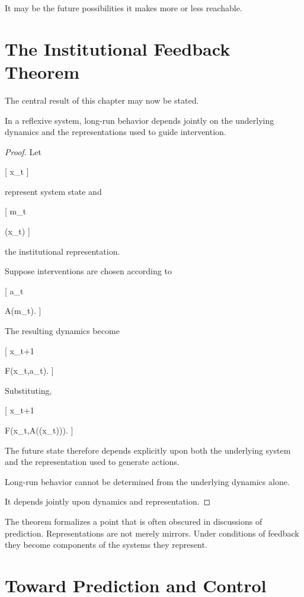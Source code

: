 \documentclass[11pt,oneside,openany]{book}
\begin{document}
It may be the future possibilities it makes more or less reachable.

\section{The Institutional Feedback Theorem}

The central result of this chapter may now be stated.

\begin{theorem}

In a reflexive system, long-run behavior depends jointly on the underlying dynamics and the representations used to guide intervention.

\end{theorem}

\begin{proof}

Let

[
x_t
]

represent system state and

[
m_t

\pi(x_t)
]

the institutional representation.

Suppose interventions are chosen according to

[
a_t

A(m_t).
]

The resulting dynamics become

[
x_{t+1}

F(x_t,a_t).
]

Substituting,

[
x_{t+1}

F\big(x_t,A(\pi(x_t))\big).
]

The future state therefore depends explicitly upon both the underlying system and the representation used to generate actions.

Long-run behavior cannot be determined from the underlying dynamics alone.

It depends jointly upon dynamics and representation.

\end{proof}

The theorem formalizes a point that is often obscured in discussions of prediction. Representations are not merely mirrors. Under conditions of feedback they become components of the systems they represent.

\section{Toward Prediction and Control}
\end{document}
